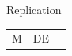 \documentclass[final]{beamer}
\begin{document}
\begin{frame}{}
\begin{textblock}{67}
\begin{block}{Replication}
\begin{tabular}{c c c}
M  & DE
\end{tabular}
\end{block}
\end{textblock}
\end{frame}
\end{document}
